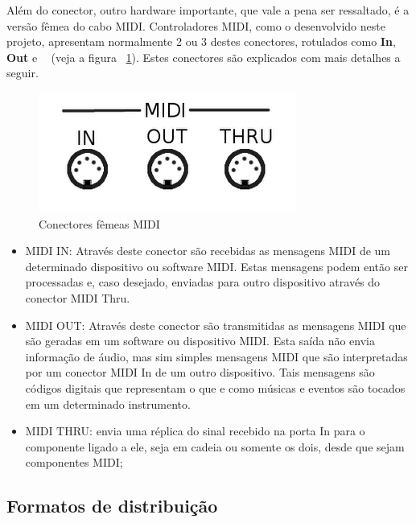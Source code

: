             Além do conector, outro hardware importante, que vale a pena ser ressaltado, é a versão fêmea do cabo MIDI. Controladores MIDI, como o desenvolvido neste projeto, apresentam normalmente 2 ou 3 destes conectores, rotulados como \textbf{In}, \textbf{Out} e \textbf{~} (veja a figura ~\ref{fig:MIDI_connector_Female}). Estes conectores são explicados com mais detalhes a seguir.
            
            \begin{figure}[H]
            	\centering
            	\includegraphics[scale=0.8]{Imagens/midi_in_out_thru.png}
            	\caption[Conectores fêmeas MIDI]{Conectores fêmeas MIDI}
            	\label{fig:MIDI_connector_Female}
            \end{figure}

            \begin{itemize}
                \item MIDI IN: Através deste conector são recebidas as mensagens MIDI de um determinado dispositivo ou software MIDI. Estas mensagens podem então ser processadas e, caso desejado, enviadas para outro dispositivo através do conector MIDI Thru.

                \item MIDI OUT: Através deste conector são transmitidas as mensagens MIDI que são geradas em um software ou dispositivo MIDI. Esta saída não envia informação de áudio, mas sim simples mensagens MIDI que são interpretadas por um conector MIDI In de um outro dispositivo. Tais mensagens são códigos digitais que representam o que e como músicas e eventos são tocados em um determinado instrumento.

                \item MIDI THRU: envia uma réplica do sinal recebido na porta In para o componente ligado a ele, seja em cadeia ou somente os dois, desde que sejam componentes MIDI;
            \end{itemize}

        \subsection{Formatos de distribuição}


